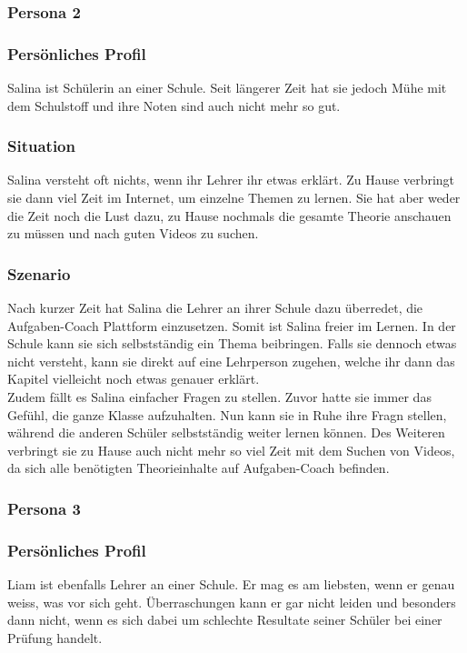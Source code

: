 \subsubsection{Persona 2}
\subsubsection*{Persönliches Profil}
Salina ist Schülerin an einer Schule. Seit längerer Zeit hat sie jedoch Mühe mit dem Schulstoff und ihre Noten sind auch nicht mehr so gut.

\subsubsection*{Situation}
Salina versteht oft nichts, wenn ihr Lehrer ihr etwas erklärt. Zu Hause verbringt sie dann viel Zeit im Internet, um einzelne Themen zu lernen. Sie hat aber weder die Zeit noch die Lust dazu, zu Hause nochmals die gesamte Theorie anschauen zu müssen und nach guten Videos zu suchen.

\subsubsection*{Szenario}
Nach kurzer Zeit hat Salina die Lehrer an ihrer Schule dazu überredet, die Aufgaben-Coach Plattform einzusetzen. Somit ist Salina freier im Lernen. In der Schule kann sie sich selbstständig ein Thema beibringen. Falls sie dennoch etwas nicht versteht, kann sie direkt auf eine Lehrperson zugehen, welche ihr dann das Kapitel vielleicht noch etwas genauer erklärt. \\
Zudem fällt es Salina einfacher Fragen zu stellen. Zuvor hatte sie immer das Gefühl, die ganze Klasse aufzuhalten. Nun kann sie in Ruhe ihre Fragn stellen, während die anderen Schüler selbstständig weiter lernen können. Des Weiteren verbringt sie zu Hause auch nicht mehr so viel Zeit mit dem Suchen von Videos, da sich alle benötigten Theorieinhalte auf Aufgaben-Coach befinden.

\subsubsection{Persona 3}
\subsubsection*{Persönliches Profil}
Liam ist ebenfalls Lehrer an einer Schule. Er mag es am liebsten, wenn er genau weiss, was vor sich geht. Überraschungen kann er gar nicht leiden und besonders dann nicht, wenn es sich dabei um schlechte Resultate seiner Schüler bei einer Prüfung handelt.

